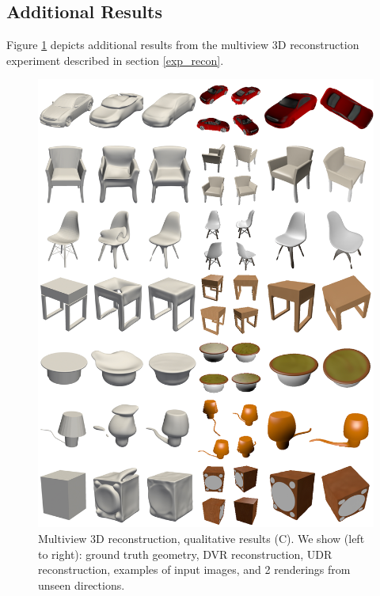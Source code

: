 \documentclass[runningheads]{llncs}
\begin{document}
\subsection{Additional Results}
Figure \ref{fig:recon3} depicts additional results from the multiview 3D reconstruction experiment described in section \ref{exp_recon}.
\begin{figure}[t]
    \centering
    \includegraphics[width=\textwidth]{lior_3.jpg}
    \caption{Multiview 3D reconstruction, qualitative results (C). We show (left to right): ground truth geometry, DVR reconstruction, UDR reconstruction, examples of input images, and 2 renderings from unseen directions.}
    \label{fig:recon3}
\end{figure}
\end{document}
